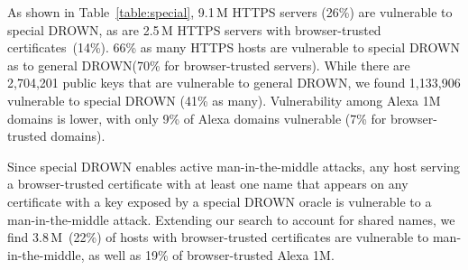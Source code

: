 
As shown in Table~\ref{table:special}, 9.1\,M HTTPS servers (26\%) are
vulnerable to special DROWN, as are 2.5\,M HTTPS servers with browser-trusted
certificates~(14\%). 66\% as many HTTPS hosts are vulnerable to special DROWN
as to general DROWN\@ (70\% for browser-trusted servers). While there are
2,704,201 public keys that are vulnerable to general DROWN, we found 1,133,906
vulnerable to special DROWN (41\% as many). Vulnerability among Alexa 1M domains is lower, with only 9\% of Alexa domains vulnerable (7\% for browser-trusted domains).

Since special DROWN enables active man-in-the-middle attacks, any host serving
a browser-trusted certificate with at least one name that appears on any
certificate with a key exposed by a special DROWN oracle is vulnerable to a
man-in-the-middle attack. Extending our search to account for shared names, we find
3.8\,M~(22\%) of hosts with browser-trusted certificates are vulnerable to
man-in-the-middle, as well as 19\% of browser-trusted Alexa 1M.


